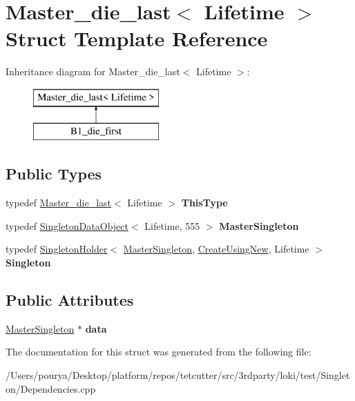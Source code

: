 \hypertarget{structMaster__die__last}{}\section{Master\+\_\+die\+\_\+last$<$ Lifetime $>$ Struct Template Reference}
\label{structMaster__die__last}
Inheritance diagram for Master\+\_\+die\+\_\+last$<$ Lifetime $>$\+:\begin{figure}[H]
\begin{center}
\leavevmode
\includegraphics[height=2.000000cm]{structMaster__die__last}
\end{center}
\end{figure}
\subsection*{Public Types}
\begin{DoxyCompactItemize}
\item 
\hypertarget{structMaster__die__last_a97fe0b8560bad9fd06d6d2e3bca363a9}{}typedef \hyperlink{structMaster__die__last}{Master\+\_\+die\+\_\+last}$<$ Lifetime $>$ {\bfseries This\+Type}\label{structMaster__die__last_a97fe0b8560bad9fd06d6d2e3bca363a9}

\item 
\hypertarget{structMaster__die__last_a3bda75a9e858404ae283f8206b7a7043}{}typedef \hyperlink{structSingletonDataObject}{Singleton\+Data\+Object}$<$ Lifetime, 555 $>$ {\bfseries Master\+Singleton}\label{structMaster__die__last_a3bda75a9e858404ae283f8206b7a7043}

\item 
\hypertarget{structMaster__die__last_a4d8edd93e0ff657bd794a1cb92eac267}{}typedef \hyperlink{classLoki_1_1SingletonHolder}{Singleton\+Holder}$<$ \hyperlink{structSingletonDataObject}{Master\+Singleton}, \hyperlink{structLoki_1_1CreateUsingNew}{Create\+Using\+New}, Lifetime $>$ {\bfseries Singleton}\label{structMaster__die__last_a4d8edd93e0ff657bd794a1cb92eac267}

\end{DoxyCompactItemize}
\subsection*{Public Attributes}
\begin{DoxyCompactItemize}
\item 
\hypertarget{structMaster__die__last_a68f664558a69b93df836ee620f544f26}{}\hyperlink{structSingletonDataObject}{Master\+Singleton} $\ast$ {\bfseries data}\label{structMaster__die__last_a68f664558a69b93df836ee620f544f26}

\end{DoxyCompactItemize}


The documentation for this struct was generated from the following file\+:\begin{DoxyCompactItemize}
\item 
/\+Users/pourya/\+Desktop/platform/repos/tetcutter/src/3rdparty/loki/test/\+Singleton/Dependencies.\+cpp\end{DoxyCompactItemize}
